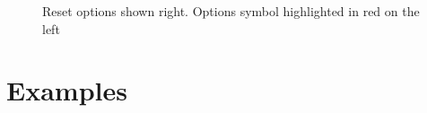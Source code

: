 \documentclass[11pt,a4paper]{article}
\begin{document}
\begin{figure}[H]
\vspace{2cm}
\caption{Reset options shown right. Options symbol highlighted in red on the left}
\end{figure}

\pagebreak


\section{Examples}
\end{document}
